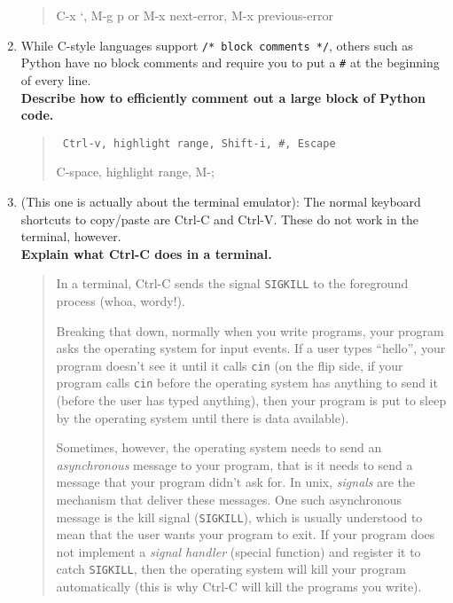 \documentclass{article}
\begin{document}
\begin{enumerate}
\begin{quote}
      {\color{red} C-x `, M-g p} or {\color{red} M-x next-error, M-x previous-error}
    \end{quote}
  \item While C-style languages support \texttt{/* block comments */}, others
    such as Python have no block comments and require you to put a \texttt{\#}
    at the beginning of every line.\\
    \textbf{Describe how to efficiently comment out a large block of Python code.}
    \begin{quote}\tt
      \color{blue} Ctrl-v, highlight range, Shift-i, \#, Escape

      \color{red} C-space, highlight range, M-;
    \end{quote}
  \item (This one is actually about the terminal emulator): The normal
    keyboard shortcuts to copy/paste are Ctrl-C and Ctrl-V. These do not work
    in the terminal, however.\\
    \textbf{Explain what Ctrl-C does in a terminal.}\\
    \begin{quote}\small
      \color{violet} In a terminal, Ctrl-C sends the signal \texttt{SIGKILL} to
      the foreground process (whoa, wordy!).

      Breaking that down, normally when you write programs, your program asks
      the operating system for input events. If a user types ``hello'', your
      program doesn't see it until it calls \texttt{cin} (on the flip side, if
      your program calls \texttt{cin} before the operating system has anything
      to send it (before the user has typed anything), then your program is
      put to sleep by the operating system until there is data available).

      Sometimes, however, the operating system needs to send an
      \emph{asynchronous} message to your program, that is it needs to send a
      message that your program didn't ask for. In unix, \emph{signals} are
      the mechanism that deliver these messages. One such asynchronous message
      is the kill signal (\texttt{SIGKILL}), which is usually understood to
      mean that the user wants your program to exit. If your program does not
      implement a \emph{signal handler} (special function) and register it to
      catch \texttt{SIGKILL}, then the operating system will kill your program
      automatically (this is why Ctrl-C will kill the programs you write).


\end{quote}
\end{enumerate}
\end{document}
